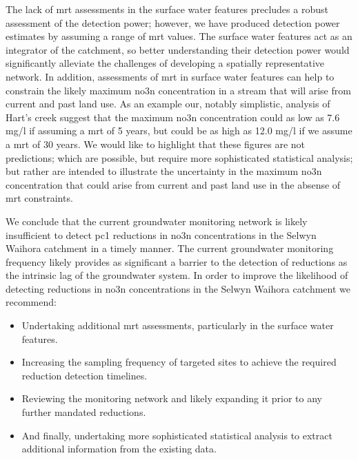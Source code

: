 The lack of \gls{mrt} assessments in the surface water features precludes a robust assessment of the detection power; however, we have produced detection power estimates by assuming a range of \gls{mrt} values. The surface water features act as an integrator of the catchment, so better understanding their detection power would significantly alleviate the challenges of developing a spatially representative network. In addition, assessments of \gls{mrt} in surface water features can help to constrain the likely maximum \gls{no3n} concentration in a stream that will arise from current and past land use. As an example our, notably simplistic, analysis of Hart's creek suggest that the maximum \gls{no3n} concentration could as low as 7.6 mg/l if assuming a \gls{mrt} of 5 years, but could be as high as 12.0 mg/l if we assume a \gls{mrt} of 30 years. We would like to highlight that these figures are not predictions; which are possible, but require more sophisticated statistical analysis; but rather are intended to illustrate the uncertainty in the maximum \gls{no3n} concentration that could arise from current and past land use in the absense of \gls{mrt} constraints.

We conclude that the current groundwater monitoring network is likely insufficient to detect \gls{pc1} reductions in \gls{no3n} concentrations in the Selwyn Waihora catchment in a timely manner. The current groundwater monitoring frequency likely provides as significant a barrier to the detection of reductions as the intrinsic lag of the groundwater system. In order to improve the likelihood of detecting reductions in \gls{no3n} concentrations in the Selwyn Waihora catchment we recommend:
\begin{itemize}
    \item Undertaking additional \gls{mrt} assessments, particularly in the surface water features.
    \item Increasing the sampling frequency of targeted sites to achieve the required reduction detection timelines.
    \item Reviewing the monitoring network and likely expanding it prior to any further mandated reductions.
    \item And finally, undertaking more sophisticated statistical analysis to extract additional information from the existing data.
\end{itemize}
